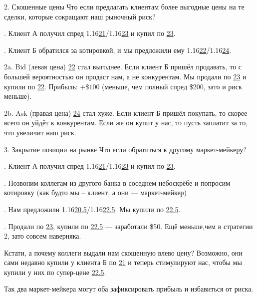 \documentclass{beamer}
\newcommand{\eurusdBigFigures}{1.16}
\begin{document}
\begin{frame}{2. Скошенные цены}
\justify
Что если предлагать клиентам более выгодные цены на те сделки, которые сокращают
наш рыночный риск?

. Клиент А получил спред \eurusdBigFigures\underline{21}/\eurusdBigFigures\underline{23} и купил по \underline{23}.

. Клиент Б обратился за котировкой, и мы предложили ему \eurusdBigFigures\underline{22}/\eurusdBigFigures\underline{24}.

\justify
2a. Bid (левая цена) \underline{22} стал выгоднее. Если клиент Б пришёл 
продавать, то с большей вероятностью он продаст нам, а не конкурентам.
Мы продали по \underline{23} и купили по \underline{22}. Прибыль: $+\$100$ (меньше, чем полный спред \$200, зато и риск меньше).

\justify
2b. Ask (правая цена) \underline{24} стал хуже. Если клиент Б пришёл покупать,
то скорее всего он уйдёт к конкурентам. Если же он купит у нас, то пусть заплатит за то, что увеличит наш риск.
\end{frame}



\begin{frame}{3. Закрытие позиции на рынке}
\justify
Что если обратиться к другому маркет-мейкеру?

. Клиент А получил спред \eurusdBigFigures\underline{21}/\eurusdBigFigures\underline{23} и купил по \underline{23}.

. Позвоним коллегам из другого банка в соседнем небоскрёбе и попросим 
котировку (как будто мы -- клиент, а они --- маркет-мейкер)

. Нам предложили \eurusdBigFigures\underline{20.5}/\eurusdBigFigures\underline{22.5}. Мы купили по \underline{22.5}.

. Продали по \underline{23}, купили по \underline{22.5} --- заработали \$50. 
Ещё меньше,чем в стратегии 2, зато совсем наверняка.

\justify
Кстати, а почему коллеги выдали нам скошенную влево цену? Возможно, они сами недавно купили у клиента Б по \underline{21} и теперь стимулируют нас, чтобы мы 
купили у них по супер-цене \underline{22.5}.

\justify
Так два маркет-мейкера могут оба зафиксировать прибыль и избавиться от риска.
\end{frame}
\end{document}
